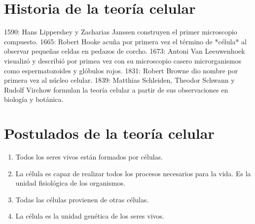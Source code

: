 


\section{Historia de la teoría celular}

1590: Hans Lippershey y Zacharias Janssen construyen el primer microscopio compuesto.
1665: Robert Hooke acuña por primera vez el término de *célula* al observar pequeñas celdas en pedazos de corcho.
1673: Antoni Van Leeuwenhoek visualizó y describió por primea vez con su microscopio casero microrganismos como espermatozoides y glóbulos rojos.
1831: Robert Browne dio nombre por primera vez al núcleo celular.
1839: Matthias Schleiden, Theodor Schwann y Rudolf Virchow formulan la teoría celular a partir de sus observaciones en biología y botánica.


\section{Postulados de la teoría celular}

\begin{enumerate}
    \item Todos los seres vivos están formados por células. 
    \item La célula es capaz de realizar todos los procesos necesarios para la vida. Es la unidad fisiológica de los organismos.
    \item Todas las células provienen de otras células.
    \item La célula es la unidad genética de los seres vivos.
\end{enumerate}